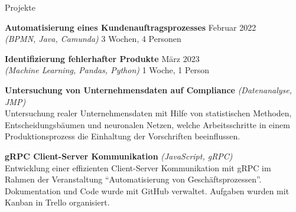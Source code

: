 \documentclass{resume} %
\begin{document}
\newpage
\begin{rSection}{Projekte}
    \vspace{-0.5em}
    \item \textbf{Automatisierung eines Kundenauftragsprozesses} \hfill {Februar 2022} \\
    \textit{(BPMN, Java, Camunda)} \hfill {3 Wochen, 4 Personen}\\

    \item \textbf{Identifizierung fehlerhafter Produkte} \hfill {März 2023} \\
    \textit{(Machine Learning, Pandas, Python)} \hfill {1 Woche, 1 Person}\\

    \item \textbf{Untersuchung von Unternehmensdaten auf Compliance} \textit{(Datenanalyse, JMP)}\\
    {Untersuchung realer Unternehmensdaten mit Hilfe von statistischen Methoden, Entscheidungsbäumen und neuronalen Netzen,
    welche Arbeitsschritte in einem Produktionsprozess die Einhaltung der Vorschriften beeinflussen.}

    \item \textbf{gRPC Client-Server Kommunikation} \textit{(JavaScript, gRPC)}\\
    {Entwicklung einer effizienten Client-Server Kommunikation mit gRPC im Rahmen der Veranstaltung “Automatisierung von Geschäftsprozessen”.
    Dokumentation und Code wurde mit GitHub verwaltet. Aufgaben wurden mit Kanban in Trello organisiert.}


\end{rSection}
\end{document}
